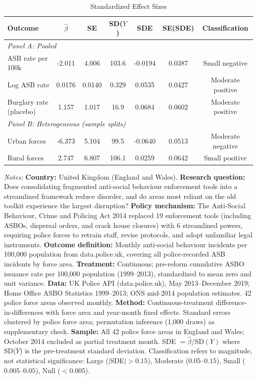 \begin{table}[htbp]
\centering
\caption{Standardized Effect Sizes}
\label{tab:sde}
\begin{threeparttable}
\small
\begin{tabular}{lcccccc}
\hline\hline
Outcome & $\hat{\beta}$ & SE & SD($Y$) & SDE & SE(SDE) & Classification \\
\hline
\multicolumn{7}{l}{\textit{Panel A: Pooled}} \\
ASB rate per 100k & -2.011 & 4.006 & 103.6 & -0.0194 & 0.0387 & Small negative \\
Log ASB rate & 0.0176 & 0.0140 & 0.329 & 0.0535 & 0.0427 & Moderate positive \\
Burglary rate (placebo) & 1.157 & 1.017 & 16.9 & 0.0684 & 0.0602 & Moderate positive \\
\hline
\multicolumn{7}{l}{\textit{Panel B: Heterogeneous (sample splits)}} \\
Urban forces & -6.373 & 5.104 & 99.5 & -0.0640 & 0.0513 & Moderate negative \\
Rural forces & 2.747 & 6.807 & 106.1 & 0.0259 & 0.0642 & Small positive \\
\hline\hline
\end{tabular}
\begin{tablenotes}[flushleft]\small
\item \textit{Notes:} \textbf{Country:} United Kingdom (England and Wales). \textbf{Research question:} Does consolidating fragmented anti-social behaviour enforcement tools into a streamlined framework reduce disorder, and do areas most reliant on the old toolkit experience the largest disruption? \textbf{Policy mechanism:} The Anti-Social Behaviour, Crime and Policing Act 2014 replaced 19 enforcement tools (including ASBOs, dispersal orders, and crack house closures) with 6 streamlined powers, requiring police forces to retrain staff, revise protocols, and adopt unfamiliar legal instruments. \textbf{Outcome definition:} Monthly anti-social behaviour incidents per 100,000 population from data.police.uk, covering all police-recorded ASB incidents by force area. \textbf{Treatment:} Continuous; pre-reform cumulative ASBO issuance rate per 100,000 population (1999--2013), standardized to mean zero and unit variance. \textbf{Data:} UK Police API (data.police.uk), May 2013--December 2019; Home Office ASBO Statistics 1999--2013; ONS mid-2014 population estimates. 42 police force areas observed monthly. \textbf{Method:} Continuous-treatment difference-in-differences with force area and year-month fixed effects. Standard errors clustered by police force area; permutation inference (1,000 draws) as supplementary check. \textbf{Sample:} All 42 police force areas in England and Wales; October 2014 excluded as partial treatment month. SDE $= \hat{\beta} / \text{SD}(Y)$ where SD($Y$) is the pre-treatment standard deviation. Classification refers to magnitude, not statistical significance: Large ($|$SDE$| > 0.15$), Moderate ($0.05$--$0.15$), Small ($0.005$--$0.05$), Null ($< 0.005$).
\end{tablenotes}
\end{threeparttable}
\end{table}
